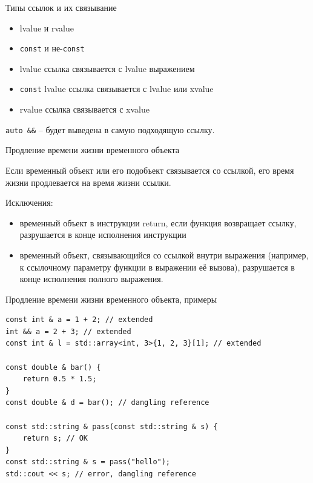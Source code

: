 \documentclass[unknownkeysallowed,xcolor=table]{beamer}
\begin{document}
\begin{frame}[fragile]{Типы ссылок и их связывание}

\begin{itemize}
  \item lvalue и rvalue \vspace{0.5em}
  \item \lstinline{const} и не-\lstinline{const}
\end{itemize}

\vspace{1em}

\begin{itemize}
  \item lvalue ссылка связывается с lvalue выражением \vspace{0.5em}
  \item \lstinline{const} lvalue ссылка связывается с lvalue или xvalue \vspace{0.5em}
  \item rvalue ссылка связывается с xvalue
\end{itemize}

\vspace{1em}

\lstinline{auto &&} -- будет выведена в самую подходящую ссылку.

\end{frame}

\begin{frame}[fragile]{Продление времени жизни временного объекта}

Если временный объект или его подобъект связывается со ссылкой, его время жизни продлевается на время жизни ссылки.

\vspace{2em}

Исключения:
\begin{itemize}
  \item временный объект в инструкции return, если функция возвращает ссылку, разрушается в конце исполнения инструкции \vspace{1em}
  \item временный объект, связывающийся со ссылкой внутри выражения (например, к ссылочному параметру функции в выражении её вызова), разрушается в конце исполнения полного выражения.
\end{itemize}

\end{frame}

\begin{frame}[fragile]{Продление времени жизни временного объекта, примеры}

\begin{lstlisting}
const int & a = 1 + 2; // extended
int && a = 2 + 3; // extended
const int & l = std::array<int, 3>{1, 2, 3}[1]; // extended

const double & bar() {
    return 0.5 * 1.5;
}
const double & d = bar(); // dangling reference

const std::string & pass(const std::string & s) {
    return s; // OK
}
const std::string & s = pass("hello");
std::cout << s; // error, dangling reference
\end{lstlisting}

\end{frame}
\end{document}
